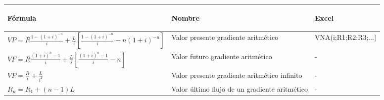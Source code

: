\begin{center}
	\begin{tabular}{ |p{6.8cm}|p{5cm}| p{3.2cm}|}
		\hline
		\rowcolor[HTML]{FFB183}
		\begin{center}\textbf{Fórmula}\end{center}                                                                                  & \begin{center}\textbf{Nombre}\end{center}                                  & \begin{center}\textbf{Excel}\end{center} \\ \hline
		
		
		$VP = R  \frac{1-(1 + i)^{-n}}{i} + \frac{L}{i}[ \frac{1-(1 + i)^{-n}}{i} - n(1 + i)^{-n} ]$\hspace{35 pt} & Valor presente gradiente aritmético                        & VNA(i;R1;R2;R3;...)       \\ \hline
		
		
		$VF = R\frac{(1+i)^n-1}{i} + \frac{L}{i}[\frac{(1+i)^n-1}{i}-n]$ \hspace{35 pt}                            & Valor futuro gradiente aritmético                                                      
		                                                                                                           & -                                                                                      \\  \hline
		
		
		$VP = \frac{R}{i} + \frac{L}{i^2}$ \hspace{35 pt}                                                          & Valor  presente gradiente aritmético infinito                                          
		                                                                                                           & -                                                                                      \\ \hline
		
		$R_{n} = R_{1} + (n-1)L$ \hspace{35 pt}                                                                    & Valor último flujo de un gradiente aritmético                                          
		                                                                                                           & -                                                                                      \\ \hline
		

\end{tabular}
\end{center}
